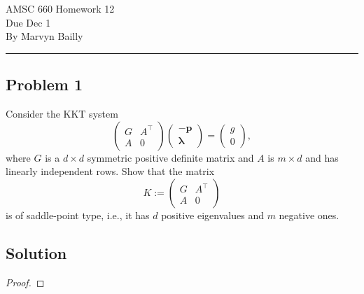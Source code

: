 \documentclass[12pt]{report}
\begin{document}
\large
\begin{center}
AMSC 660 Homework 12\\
Due Dec 1\\
By Marvyn Bailly\\
\end{center}
\normalsize
\hrule



\begin{problem}%
\subsection*{Problem 1}

Consider the KKT system 
\begin{equation*}
    \begin{pmatrix}
        G & A^\top\\ A & 0
    \end{pmatrix} \begin{pmatrix}
        -\mathbf{p} \\ \mathbf{\lambda}
    \end{pmatrix} = \begin{pmatrix}
        g \\ 0
    \end{pmatrix},
\end{equation*}
where $G$ is a $d\times d$ symmetric positive definite matrix and $A$ is $m\times d$ and has linearly independent rows. Show that the matrix
\begin{equation*}
    K := \begin{pmatrix}
        G & A^\top \\ A & 0
    \end{pmatrix}
\end{equation*}
is of saddle-point type, i.e., it has $d$ positive eigenvalues and $m$ negative ones.

\subsection*{Solution}
\begin{proof}


\end{proof}
\end{problem}
\end{document}
